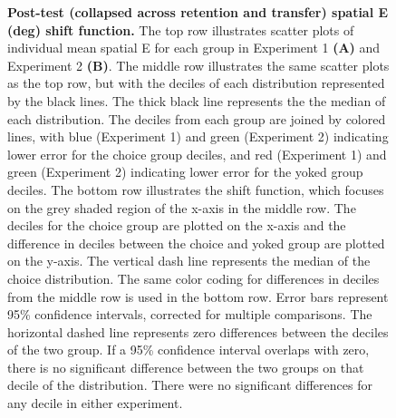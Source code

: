 \documentclass[
  man, donotrepeattitle,floatsintext]{apa7}
\begin{document}
\begin{figure}
\caption{\small \onehalfspacing \textbf{Post-test (collapsed across retention and transfer) spatial E (deg) shift function.} The top row illustrates scatter plots of individual mean spatial E for each group in Experiment 1 \textbf{(A)} and Experiment 2 \textbf{(B)}. The middle row illustrates the same scatter plots as the top row, but with the deciles of each distribution represented by the black lines. The thick black line represents the the median of each distribution. The deciles from each group are joined by colored lines, with blue (Experiment 1) and green (Experiment 2) indicating lower error for the choice group deciles, and red (Experiment 1) and green (Experiment 2) indicating lower error for the yoked group deciles. The bottom row illustrates the shift function, which focuses on the grey shaded region of the x-axis in the middle row. The deciles for the choice group are plotted on the x-axis and the difference in deciles between the choice and yoked group are plotted on the y-axis. The vertical dash line represents the median of the choice distribution. The same color coding for differences in deciles from the middle row is used in the bottom row. Error bars represent 95\% confidence intervals, corrected for multiple comparisons. The horizontal dashed line represents zero differences between the deciles of the two group. If a 95\% confidence interval overlaps with zero, there is no significant difference between the two groups on that decile of the distribution. There were no significant differences for any decile in either experiment.}\label{fig:figS3}
\end{figure}
\end{document}
